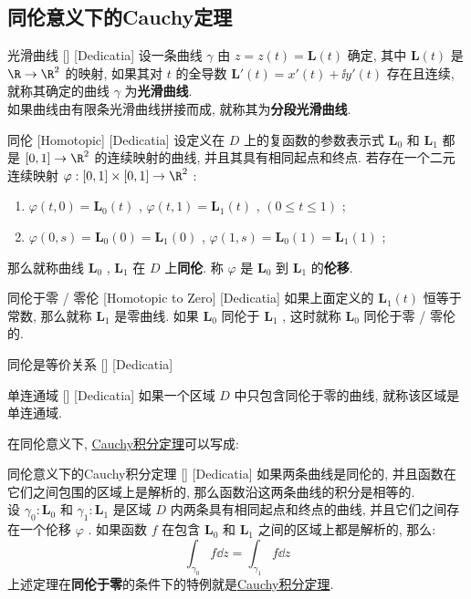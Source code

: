 \documentclass[UTF8]{ctexart}
\newcommand{\CauchyThm}{\hyperref[thm:Cauchy]{Cauchy积分定理}}
\begin{document}
\subsection{同伦意义下的Cauchy定理}
\begin{dfn}
    [UUID]
    {光滑曲线}
    []
    [Dedicatia]
    设一条曲线 \( \gamma \) 由 \( z=z(t)=\bm{L}(t) \) 确定, 其中 \( \bm{L}(t) \) 是 \( \R\to\R^2 \) 的映射, 如果其对 \( t \) 的全导数 \( \bm{L}'(t)=x'(t)+\ii y'(t) \) 存在且连续, 就称其确定的曲线 \( \gamma \) 为\textbf{光滑曲线}. \\
    如果曲线由有限条光滑曲线拼接而成, 就称其为\textbf{分段光滑曲线}. 
\end{dfn}
\begin{dfn}
    [UUID]
    {同伦}
    [Homotopic]
    [Dedicatia]
    设定义在 \( D \) 上的复函数的参数表示式 \( \bm{L}_0 \) 和 \( \bm{L}_1 \) 都是 \( [0,1]\to\R^2 \) 的连续映射的曲线, 并且其具有相同起点和终点. 若存在一个二元连续映射 \( \varphi:[0,1]\times[0,1]\to\R^2 \) :
    \begin{enumerate}
        \item  \( \varphi(t,0)=\bm{L}_0(t) \) ,  \( \varphi(t,1)=\bm{L}_1(t) \) ,  \( (0\leq t\leq 1) \) ;
        \item  \( \varphi(0,s)=\bm{L}_0(0)=\bm{L}_1(0) \) ,  \( \varphi(1,s)=\bm{L}_0(1)=\bm{L}_1(1) \) ;
    \end{enumerate}
    那么就称曲线 \( \bm{L}_0 \) ,  \( \bm{L}_1 \) 在 \( D \) 上\textbf{同伦}. 称 \( \varphi \) 是 \( \bm{L}_0 \) 到 \( \bm{L}_1 \) 的\textbf{伦移}. 
\end{dfn}
\begin{dfn}
    [UUID]
    {同伦于零 / 零伦}
    [Homotopic to Zero]
    [Dedicatia]
    如果上面定义的 \( \bm{L}_1(t) \) 恒等于常数, 那么就称 \( \bm{L}_1 \) 是零曲线. 如果 \( \bm{L}_0 \) 同伦于 \( \bm{L}_1 \) , 这时就称 \( \bm{L}_0 \) 同伦于零 / 零伦的. 
\end{dfn}
\begin{ppt}
    [UUID]
    {同伦是等价关系}
    []
    [Dedicatia]
\end{ppt}
\begin{dfn}
    [UUID]
    {单连通域}
    []
    [Dedicatia]
    如果一个区域 \( D \) 中只包含同伦于零的曲线, 就称该区域是单连通域. 
\end{dfn}
在同伦意义下, \CauchyThm 可以写成: 
\begin{thm}
    [UUID]
    {同伦意义下的Cauchy积分定理}
    []
    [Dedicatia]
    如果两条曲线是同伦的, 并且函数在它们之间包围的区域上是解析的, 那么函数沿这两条曲线的积分是相等的. \\
    设  \( \gamma_0:\bm{L}_0 \)  和  \( \gamma_1:\bm{L}_1 \)  是区域  \( D \)  内两条具有相同起点和终点的曲线, 并且它们之间存在一个伦移  \( \varphi \) . 如果函数 \( f \) 在包含 \( \bm{L}_0 \) 和 \( \bm{L}_1 \) 之间的区域上都是解析的, 那么: 
    \[\int_{\gamma_0}f\dd{z}=\int_{\gamma_1}f\dd{z}\]
    上述定理在\textbf{同伦于零}的条件下的特例就是\CauchyThm .
\end{thm}
\end{document}
